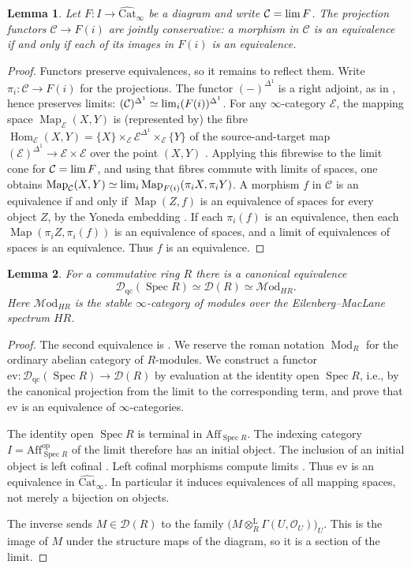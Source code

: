 \documentclass[11pt]{amsart}
\newcommand{\cE}{\mathcal{E}}
\newcommand{\cO}{\mathcal{O}}
\newcommand{\cC}{\mathcal{C}}
\newcommand{\cD}{\mathcal{D}}
\newcommand{\Hom}{\operatorname{Hom}}
\newcommand{\Map}{\operatorname{Map}}
\newcommand{\Mod}{\operatorname{Mod}}
\newcommand{\cMod}{\mathcal{M}\mathrm{od}}
\newcommand{\op}{{\operatorname{op}}}
\renewcommand{\lim}{\operatornamewithlimits{\rm{lim}}}
\newcommand{\Spec}{\operatorname{Spec}}
\newcommand{\Aff}{\mathrm{Aff}}
\newcommand{\ev}{\mathrm{ev}}
\newcommand{\Catbig}{\widehat{\mathrm{Cat}}}
\newcommand{\Dqc}{\mathcal D_{\mathrm{qc}}}
\theoremstyle{plain}
\newtheorem{lemma}[lemma]{Lemma}
\theoremstyle{definition}
\numberwithin{equation}{section}
\begin{document}
\begin{lemma}\label{lem:projections-conservative}
Let $F:I\to\Catbig_\infty$ be a diagram and write $\cC=\lim F$.
The projection functors $\cC\to F(i)$ are jointly conservative: a morphism in $\cC$ is an equivalence if and only if each of its images in $F(i)$ is an equivalence.
\end{lemma}
\begin{proof}
Functors preserve equivalences, so it remains to reflect them.
Write $\pi_i:\cC\to F(i)$ for the projections.
The functor $(-)^{\Delta^1}$ is a right adjoint, as in , hence preserves limits:
$(\cC)^{\Delta^1}\simeq\lim_i(F(i))^{\Delta^1}$.
For any $\infty$-category $\cE$, the mapping space $\Map_{\cE}(X,Y)$ is (represented by) the fibre
$\Hom_{\cE}(X,Y)=\{X\}\times_{\cE}\cE^{\Delta^1}\times_{\cE}\{Y\}$ of the source-and-target map
$(\cE)^{\Delta^1}\to\cE\times\cE$ over the point $(X,Y)$ \cite[Remark 1.2.2.5]{HTT}.
Applying this fibrewise to the limit cone for $\cC=\lim F$, and using that fibres commute with limits of spaces, one obtains
$\Map_{\cC}(X,Y)\simeq\lim_i\Map_{F(i)}(\pi_iX,\pi_iY)$.
A morphism $f$ in $\cC$ is an equivalence if and only if $\Map(Z,f)$ is an equivalence of spaces for every object $Z$, by the Yoneda embedding \cite[Proposition 5.1.3.1]{HTT}.
If each $\pi_i(f)$ is an equivalence, then each $\Map(\pi_iZ,\pi_i(f))$ is an equivalence of spaces, and a limit of equivalences of spaces is an equivalence.
Thus $f$ is an equivalence.
\end{proof}

\begin{lemma}\label{lem:dqc-affine}
For a commutative ring $R$ there is a canonical equivalence
\[
 \Dqc(\Spec R)\simeq\cD(R)\simeq\cMod_{HR}.
\]
Here $\cMod_{HR}$ is the stable $\infty$-category of modules over the Eilenberg--MacLane spectrum $HR$.
\end{lemma}
\begin{proof}
The second equivalence is \cite[Theorem 7.1.2.13]{HA}.
We reserve the roman notation $\Mod_R$ for the ordinary abelian category of $R$-modules.
We construct a functor $\ev:\Dqc(\Spec R)\to\cD(R)$ by evaluation at the identity open $\Spec R$, i.e., by the canonical projection from the limit to the corresponding term, and prove that $\ev$ is an equivalence of $\infty$-categories.

The identity open $\Spec R$ is terminal in $\Aff_{\Spec R}$.
The indexing category $I=\Aff_{\Spec R}^{\op}$ of the limit therefore has an initial object.
The inclusion of an initial object is left cofinal \cite[\href{https://kerodon.net/tag/03LQ}{Tag 03LQ}]{Kerodon}.
Left cofinal morphisms compute limits \cite[\href{https://kerodon.net/tag/02NS}{Tag 02NS}]{Kerodon}.
Thus $\ev$ is an equivalence in $\Catbig_\infty$.
In particular it induces equivalences of all mapping spaces, not merely a bijection on objects.

The inverse sends $M\in\cD(R)$ to the family $\bigl(M\otimes_R^{\mathrm L}\Gamma(U,\cO_U)\bigr)_U$.
This is the image of $M$ under the structure maps of the diagram, so it is a section of the limit.
\end{proof}
\end{document}
